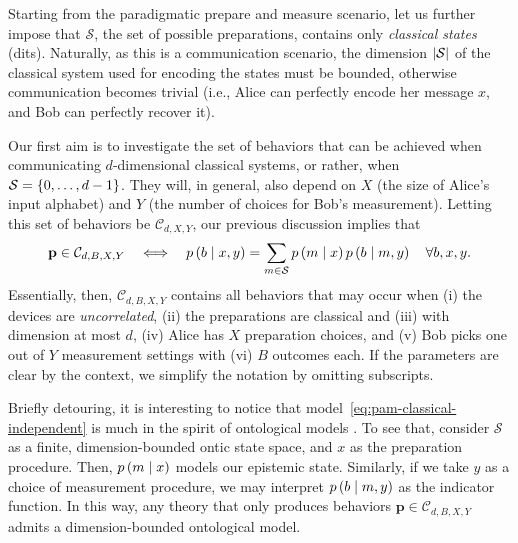             Starting from the paradigmatic prepare and measure scenario, let us further impose that $\mathcal{S}$, the set of possible preparations, contains only \emph{classical states} (dits). Naturally, as this is a communication scenario, the dimension $\abs{\mathcal{S}}$ of the classical system used for encoding the states must be bounded, otherwise communication becomes trivial (i.e., Alice can perfectly encode her message $x$, and Bob can perfectly recover it).
            
            Our first aim is to investigate the set of behaviors that can be achieved when communicating $d$-dimensional classical systems, or rather, when  $\mathcal{S} = \{ 0, \ldots, d-1 \}$. They will, in general, also depend on $X$ (the size of Alice's input alphabet) and $Y$ (the number of choices for Bob's measurement). Letting this set of behaviors be $\mathcal{C}_{d,X,Y}$, our previous discussion implies that
            \begin{equation}
                \mathbf{p} \in \mathcal{C}_{d,B,X,Y} \quad\Longleftrightarrow \quad p \left( b \mid x,y \right) = \sum_{m \in \mathcal{S}} p \left( m \mid x \right) p \left( b \mid m,y \right) \quad\forall b,x,y .
                \label{eq:pam-classical-independent}
            \end{equation}
            Essentially, then, $\mathcal{C}_{d,B,X,Y}$ contains all behaviors that may occur when (i) the devices are \emph{uncorrelated}, (ii) the preparations are classical and (iii) with dimension at most $d$, (iv) Alice has $X$ preparation choices, and (v) Bob picks one out of $Y$ measurement settings with (vi) $B$ outcomes each. If the parameters are clear by the context, we simplify the notation by omitting subscripts.
            
            Briefly detouring, it is interesting to notice that model~\eqref{eq:pam-classical-independent} is much in the spirit of ontological models \cite{spekkens_2005_contextuality,harrigan_2008_ontological,galvao_2009_economical}. To see that, consider $\mathcal{S}$ as a finite, dimension-bounded ontic state space, and $x$ as the preparation procedure. Then, $p \left( m \mid x \right)$ models our epistemic state. Similarly, if we take $y$ as a choice of measurement procedure, we may interpret $p \left( b \mid m,y \right)$ as the indicator function. In this way, any theory that only produces behaviors $\mathbf{p} \in \mathcal{C}_{d,B,X,Y}$ admits a dimension-bounded ontological model.
            
